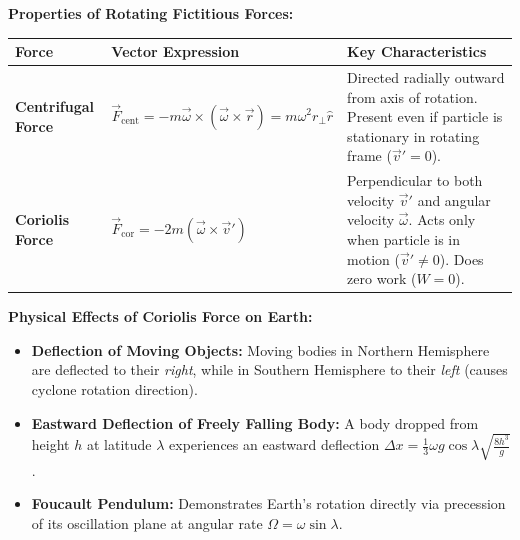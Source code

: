 \documentclass[12pt,a4paper]{article}
\begin{document}
\textbf{Properties of Rotating Fictitious Forces:}\par\vspace{6pt}\noindent
\begin{tabularx}{\linewidth}{|B{3.2cm}|Y|Y|}
\hline
\textbf{Force} & \textbf{Vector Expression} & \textbf{Key Characteristics} \\
\hline
\textbf{Centrifugal Force} & $\vec{F}_{\text{cent}} = -m\vec{\omega} \times (\vec{\omega} \times \vec{r}) = m \omega^2 r_{\perp} \hat{r}$ & Directed radially outward from axis of rotation. Present even if particle is stationary in rotating frame ($\vec{v}' = 0$). \\
\hline
\textbf{Coriolis Force} & $\vec{F}_{\text{cor}} = -2m(\vec{\omega} \times \vec{v}')$ & Perpendicular to both velocity $\vec{v}'$ and angular velocity $\vec{\omega}$. Acts only when particle is in motion ($\vec{v}' \neq 0$). Does zero work ($W = 0$). \\
\hline
\end{tabularx}

\textbf{Physical Effects of Coriolis Force on Earth:}
\begin{itemize}[leftmargin=*, itemsep=2pt]
  \item \textbf{Deflection of Moving Objects:} Moving bodies in Northern Hemisphere are deflected to their \textit{right}, while in Southern Hemisphere to their \textit{left} (causes cyclone rotation direction).
  \item \textbf{Eastward Deflection of Freely Falling Body:} A body dropped from height $h$ at latitude $\lambda$ experiences an eastward deflection $\Delta x = \frac{1}{3} \omega g \cos \lambda \sqrt{\frac{8h^3}{g}}$.
  \item \textbf{Foucault Pendulum:} Demonstrates Earth's rotation directly via precession of its oscillation plane at angular rate $\Omega = \omega \sin \lambda$.
\end{itemize}
\end{document}
